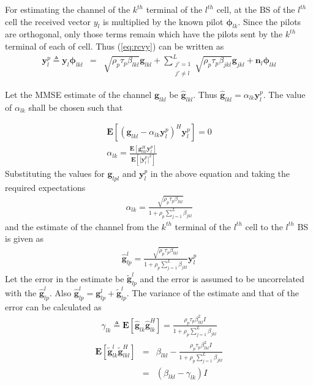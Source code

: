 \documentclass[10pt, a4paper, twoside,fleqn]{article}
\begin{document}
For estimating the channel of the $k^{th}$ terminal of the $l^{th}$ cell, at the BS of the $l^{th}$ cell the received vector $y_{l}$ is multiplied by the known pilot $\pmb{\phi}_{lk}$. Since the pilots are orthogonal, only those terms remain which have the pilots sent by the $k^{th}$ terminal of each of cell. Thus (\ref{eq:rcvy}) can be written as
\begin{eqnarray}
	\pmb{y}_{l}^{p} \triangleq \pmb{y}_{l} \pmb{\phi}_{lkl}
                          &=&     \sqrt{\rho_p\tau_p\beta_{lkl}}\pmb{g}_{lkl}
                           +      \sum_{\substack{j'=1 \\ j' \neq l}}^{L} \sqrt{\rho_p\tau_p\beta_{jkl}}\pmb{g}_{jkl}
             			   +      \pmb{n}_{l}\pmb{\phi}_{lkl}
\end{eqnarray}

Let the MMSE estimate of the channel $\pmb{g}_{lkl}$ be $\pmb{\hat g}_{lkl}$. Thus $\pmb{\hat g}_{lkl} = \alpha_{lk}\pmb{y}_{l}^{p}$. The value of $\alpha_{lk}$ shall be chosen such that
        
\begin{eqnarray}
	\pmb{E}[(\pmb{g}_{lkl}-\alpha_{lk}\pmb{y}_{l}^{p})^H \pmb{y}_{l}^{p}] = 0 \\
	\alpha_{lk} = \frac{\pmb{E}[\pmb{g}^{H}_{lkl} \pmb{y}_{l}^{p}]}{\pmb{E}[|\pmb{y}_{l}^{p}|^2]}
\end{eqnarray}
Substituting the values for $\pmb{g}_{lpl}$ and $\pmb{y}_{l}^{p}$ in the above equation and taking the required expectations
\begin{eqnarray}\label{eq:alphapll}
	\alpha_{lk}=\frac{\sqrt{\rho_p \tau_p \beta_{lkl}}}{1+\rho_p\sum\limits_{j=1}^{L}\beta_{jkl}}
\end{eqnarray}
and the estimate of the channel from the $k^{th}$ terminal of the $l^{th}$ cell to the $l^{th}$ BS is given as
\begin{eqnarray}\label{eq:estimatehpll}
	\pmb{\hat g}_{lp}^{l} = \frac{\sqrt{\rho_p\tau_p\beta_{lkl}}}{1+\rho_p\sum\limits_{j=1}^{L}\beta_{jkl}} \pmb{y}_{l}^{p}
\end{eqnarray}
Let the error in the estimate be ${\pmb{\widetilde{g}}_{lp}^{l}}$ and the error is assumed to be uncorrelated with the $\pmb{\hat g}_{lp}^{l}$. Also $\pmb{\hat g}_{lp}^{l}=\pmb{g}_{lp}^{l}+\pmb{\widetilde{g}}_{lp}^{l}$.
The variance of the estimate and that of the error can be calculated as
\begin{eqnarray}
	\gamma_{lk} \triangleq \pmb{E}[\pmb{\hat g}_{lk}\pmb{\hat g}^H_{lk}]
                    =       \frac{\rho_p\tau_p\beta^2_{lkl}I}{1+\rho_p\sum\limits_{j=1}^{L}\beta_{jkl}} 
\end{eqnarray}
\begin{eqnarray}
    \pmb{E}[\pmb{\widetilde{g}}_{lk}^{l} \pmb{\widetilde{g}}^H_{lkl}] &=& \beta_{lkl}- \frac{\rho_p\tau_p\beta^2_{lkl}I}{1+\rho_p\sum\limits_{j=1}^{L}\beta_{jkl}} \nonumber\\
          									    &=& (\beta_{lkl} - \gamma_{lk})I
\end{eqnarray}
\end{document}

